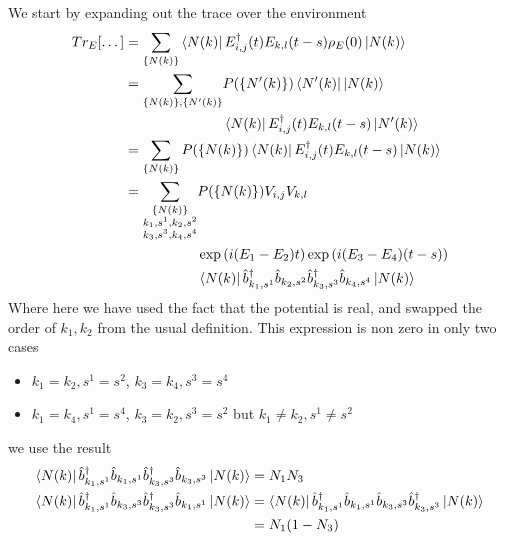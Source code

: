 We start by expanding out the trace
over the environment
\begin{align}
    Tr_E[\dots] & = \sum_{\{N(k)\}}
    \bra{N(k)} E^\dagger_{i,j}(t)E_{k,l}(t-s) \rho_E(0) \ket{N(k)}
    \\
                & = \begin{aligned}[t]
        \sum_{\{N(k)\}, \{N'(k)\}} &
        P(\{N'(k)\}) \bra{N'(k)}  \ket{N(k)}                                               \\
                                   & \bra{N(k)} E^\dagger_{i,j}(t)E_{k,l}(t-s) \ket{N'(k)}
    \end{aligned} \\
                & = \sum_{\{N(k)\}}
    P(\{N(k)\}) \bra{N(k)}
    E^\dagger_{i,j}(t)E_{k,l}(t-s) \ket{N(k)} \\
                & = \begin{aligned}[t]
        \sum_{\substack{\{N(k)\}                             \\
        k_1,s^1,k_2,s^2                                      \\
                k_3,s^3,k_4,s^4 }}
         & P(\{N(k)\}) V_{i,j} V_{k,l}                       \\
         & \exp{(i(E_1 - E_2) t)} \exp{(i(E_3 - E_4) (t-s))} \\
         & \bra{N(k)}
        \hat{b}_{k_1,s^1}^\dagger{} \hat{b}_{k_2,s^2}
        \hat{b}_{k_3,s^3}^\dagger{} \hat{b}_{k_4,s^4}
        \ket{N(k)}
    \end{aligned}
\end{align}
Where here we have used
the fact that the
potential is real, and
swapped the order of \(k_1, k_2\)
from the usual definition.
This expression is non zero
in only two cases
\begin{itemize}
    \item \(k_1=k_2, s^1=s^2\),
          \(k_3=k_4, s^3=s^4\)
    \item \(k_1=k_4, s^1=s^4\),
          \(k_3=k_2, s^3=s^2\) but
          \(k_1\neq{}k_2, s^1\neq{}s^2\)
\end{itemize}
we use the result
\begin{align}
    \bra{N(k)}
    \hat{b}_{k_1,s^1}^\dagger{}
    \hat{b}_{k_1,s^1}
    \hat{b}_{k_3,s^3}^\dagger{}
    \hat{b}_{k_3,s^3}\ket{N(k)} & = N_1 N_3       \\
    \bra{N(k)}
    \hat{b}_{k_1,s^1}^\dagger{}
    \hat{b}_{k_3,s^3}
    \hat{b}_{k_3,s^3}^\dagger{}
    \hat{b}_{k_1,s^1}\ket{N(k)} & = \bra{N(k)}
    \hat{b}_{k_1,s^1}^\dagger{}
    \hat{b}_{k_1,s^1}
    \hat{b}_{k_3,s^3}
    \hat{b}_{k_3,s^3}^\dagger{}
    \ket{N(k)}                                    \\
                                & = N_1 (1 - N_3)
\end{align}
